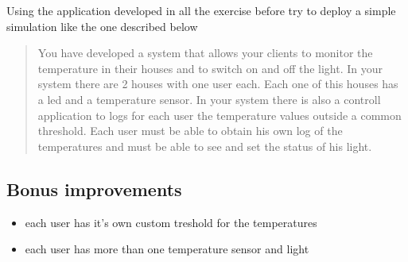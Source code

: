 \documentclass[a4paper]{article}
\begin{document}
Using the application developed in all the exercise before try to deploy a simple simulation like the one described below

\begin{quote}
You have developed a system that allows your clients to monitor the temperature in their houses and to switch on and off the light. In your system there are 2 houses with one user each. Each one of this houses has a led and a temperature sensor. In your system there is also a controll application to logs for each user the temperature values outside a common threshold. Each user must be able to obtain his own log of the temperatures and must be able to see and set the status of his light.
\end{quote}

\subsection{Bonus improvements}
\label{sec:orgc94cf6c}
\begin{itemize}
\item each user has it's own custom treshold for the temperatures
\item each user has more than one temperature sensor and light
\end{itemize}
\end{document}
